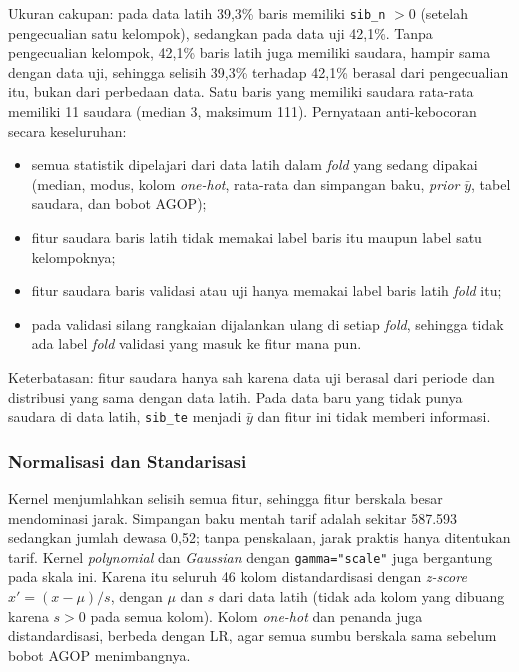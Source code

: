 
Ukuran cakupan: pada data latih 39,3\% baris memiliki \texttt{sib\_n} $> 0$ (setelah pengecualian satu kelompok), sedangkan pada data uji 42,1\%. Tanpa pengecualian kelompok, 42,1\% baris latih juga memiliki saudara, hampir sama dengan data uji, sehingga selisih 39,3\% terhadap 42,1\% berasal dari pengecualian itu, bukan dari perbedaan data. Satu baris yang memiliki saudara rata-rata memiliki 11 saudara (median 3, maksimum 111). Pernyataan anti-kebocoran secara keseluruhan:
\begin{itemize}
	\item semua statistik dipelajari dari data latih dalam \textit{fold} yang sedang dipakai (median, modus, kolom \textit{one-hot}, rata-rata dan simpangan baku, \textit{prior} $\bar{y}$, tabel saudara, dan bobot AGOP);
	\item fitur saudara baris latih tidak memakai label baris itu maupun label satu kelompoknya;
	\item fitur saudara baris validasi atau uji hanya memakai label baris latih \textit{fold} itu;
	\item pada validasi silang rangkaian dijalankan ulang di setiap \textit{fold}, sehingga tidak ada label \textit{fold} validasi yang masuk ke fitur mana pun.
\end{itemize}
Keterbatasan: fitur saudara hanya sah karena data uji berasal dari periode dan distribusi yang sama dengan data latih. Pada data baru yang tidak punya saudara di data latih, \texttt{sib\_te} menjadi $\bar{y}$ dan fitur ini tidak memberi informasi.

\subsubsection{Normalisasi dan Standarisasi}
Kernel menjumlahkan selisih semua fitur, sehingga fitur berskala besar mendominasi jarak. Simpangan baku mentah tarif adalah sekitar 587.593 sedangkan jumlah dewasa 0,52; tanpa penskalaan, jarak praktis hanya ditentukan tarif. Kernel \textit{polynomial} dan \textit{Gaussian} dengan \texttt{gamma="scale"} juga bergantung pada skala ini. Karena itu seluruh 46 kolom distandardisasi dengan \textit{z-score} $x' = (x - \mu)/s$, dengan $\mu$ dan $s$ dari data latih (tidak ada kolom yang dibuang karena $s > 0$ pada semua kolom). Kolom \textit{one-hot} dan penanda juga distandardisasi, berbeda dengan LR, agar semua sumbu berskala sama sebelum bobot AGOP menimbangnya.

